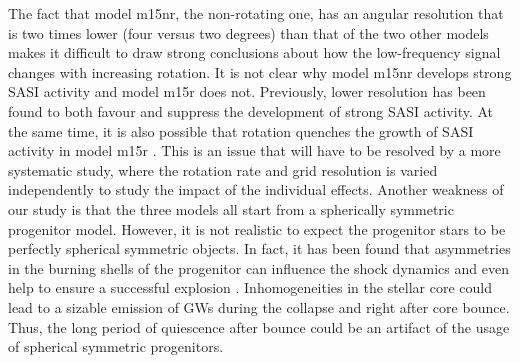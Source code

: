 The fact that model m15nr, the non-rotating one, has an angular resolution that is two times lower
(four versus two degrees) than that of the two other models makes it difficult to draw strong conclusions about how the low-frequency signal changes with increasing rotation. It is not clear why model m15nr develops strong SASI
activity and model m15r does not. Previously, lower resolution has been found to both favour \citep{hanke_12} and suppress \citep{abdikamalov_15} the development of strong SASI activity. At the same time, 
it is also possible that rotation quenches the growth of SASI activity in model m15r \citep{kazeroni_17}.
This is an issue that will have to be resolved by a more systematic study, where the rotation rate and grid resolution
is varied independently to study the impact of the individual effects.
Another weakness of our study is that the three
models all start from a spherically symmetric progenitor model. 
However, it is not realistic to expect the progenitor stars to be perfectly spherical symmetric objects.
In fact, it has been found that asymmetries in the burning shells of the progenitor can influence the shock dynamics and even help to ensure a
successful explosion \citep{burrows_96,fryer_04,arnett_11,couch_13,mueller_15a}. Inhomogeneities in the stellar core could lead to a sizable emission of GWs during the collapse and right after core bounce. Thus, the long period of quiescence after bounce could be an artifact of the usage of spherical symmetric progenitors.

